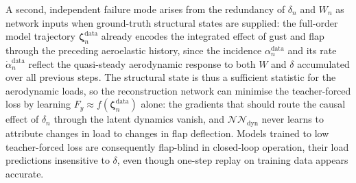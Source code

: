 A second, independent failure mode arises from the redundancy of $\delta_n$ and $W_n$ as network
inputs when ground-truth structural states are supplied: the full-order model trajectory
$\boldsymbol{\zeta}_n^\mathrm{data}$ already encodes the integrated effect of gust and flap through
the preceding aeroelastic history, since the incidence $\alpha_n^\mathrm{data}$ and its rate
$\dot\alpha_n^\mathrm{data}$ reflect the quasi-steady aerodynamic response to both $W$ and $\delta$
accumulated over all previous steps. The structural state is thus a sufficient statistic for the
aerodynamic loads, so the reconstruction network can minimise the teacher-forced loss by learning
$F_y \approx f(\boldsymbol{\zeta}_n^\mathrm{data})$ alone: the gradients that should route the
causal effect of $\delta_n$ through the latent dynamics vanish, and $\mathcal{NN}_\mathrm{dyn}$
never learns to attribute changes in load to changes in flap deflection. Models trained to low
teacher-forced loss are consequently flap-blind in closed-loop operation, their load predictions
insensitive to $\delta$, even though one-step replay on training data appears accurate.

